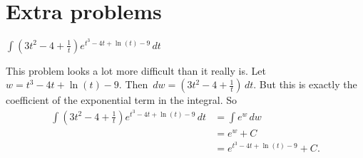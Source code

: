 \documentclass[nooutcomes, handout]{ximera}
\renewcommand{\d}{\,d}
\begin{document}
\newpage















	
	
	
	
	
	
	
	
	

	










								
				
				
	







\section{Extra problems}


\begin{problem}
  $\int \left( 3t^2 - 4 + \frac{1}{t} \right) e^{t^3 - 4t + \ln(t) -
    9} \d t$
  \begin{freeResponse}
    This problem looks a lot more difficult than it really is.  Let
    $w=t^3 - 4t + \ln(t) - 9$.  Then
    $\d w = \left( 3t^2 - 4 + \frac{1}{t} \right) \d t$.  But this is
    exactly the coefficient of the exponential term in the integral.
    So
    \begin{align*}
      \int \left( 3t^2 - 4 + \frac{1}{t} \right) e^{t^3 - 4t + \ln(t) - 9} \d t &= \int e^w \d w  \\
                                                                                &= e^w + C  \\
                                                                                &= e^{t^3 - 4t + \ln(t) - 9} + C.
    \end{align*}
  \end{freeResponse}
		
\end{problem}
\end{document}
